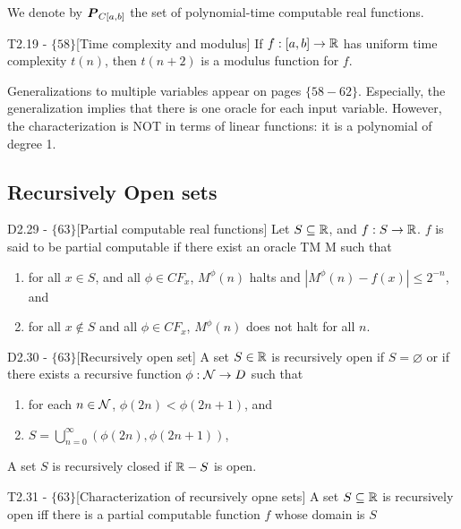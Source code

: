\documentclass{article}
\begin{document}
We denote by $\boldsymbol{P}_{C[a,b]}$ the set of polynomial-time computable real functions.

\begin{flexitheorem}{T2.19 - $\{58\}$}[Time complexity and modulus]
    If $f : [a,b] \to \mathbb{R}$ has uniform time complexity $t(n)$, then $t(n+2)$ is a modulus function for $f$.
\end{flexitheorem}

Generalizations to multiple variables appear on pages $\{58-62\}$. Especially, the generalization implies that there is one oracle for each input variable. However, the characterization is NOT in terms of linear functions: it is a polynomial of degree 1.

\subsection{Recursively Open sets}

\begin{flexidefinition}{D2.29 - $\{63\}$}[Partial computable real functions]
    Let $S \subseteq \mathbb{R}$, and $f : S \to \mathbb{R}$. $f$ is said to be partial computable if there exist an oracle TM M such that
    \begin{enumerate}[label=(\roman*)]
        \item for all $x \in S$, and all $\phi \in CF_x$, $M^\phi(n)$ halts and $|M^\phi(n) - f(x)| \leq 2^{-n}$, and
        \item for all $x \notin S$ and all $\phi \in CF_x$, $M^\phi(n)$ does not halt for all $n$.
    \end{enumerate}    
\end{flexidefinition}

\begin{flexidefinition}{D2.30 - $\{63\}$}[Recursively open set]
    A set $S \in \mathbb{R}$ is recursively open if $S = \varnothing$ or if there exists a recursive function $\phi : \mathcal{N} \to D$ such that
    \begin{enumerate}[label=(\roman*)]
        \item for each $n \in \mathcal{N}$, $\phi(2n) < \phi(2n+1)$, and
        \item $S = \bigcup_{n=0}^\infty (\phi(2n), \phi(2n+1))$,
    \end{enumerate}
    A set $S$ is recursively closed if $\mathbb{R} - S$ is open.
\end{flexidefinition}

\begin{flexitheorem}{T2.31 - $\{63\}$}[Characterization of recursively opne sets]
    A set $S \subseteq \mathbb{R}$ is recursively open iff there is a partial computable function $f$ whose domain is $S$
\end{flexitheorem}
\end{document}
